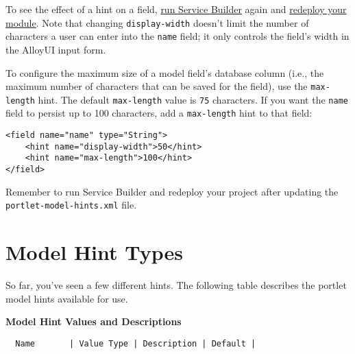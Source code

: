 To see the effect of a hint on a field,
\href{/docs/7-2/appdev/-/knowledge_base/a/running-service-builder}{run
Service Builder} again and
\href{/docs/7-2/reference/-/knowledge_base/r/deploying-a-project}{redeploy
your module}. Note that changing \texttt{display-width} doesn't limit
the number of characters a user can enter into the \texttt{name} field;
it only controls the field's width in the AlloyUI input form.

To configure the maximum size of a model field's database column (i.e.,
the maximum number of characters that can be saved for the field), use
the \texttt{max-length} hint. The default \texttt{max-length} value is
\texttt{75} characters. If you want the \texttt{name} field to persist
up to 100 characters, add a \texttt{max-length} hint to that field:

\begin{verbatim}
<field name="name" type="String">
    <hint name="display-width">50</hint>
    <hint name="max-length">100</hint>
</field>
\end{verbatim}

Remember to run Service Builder and redeploy your project after updating
the \texttt{portlet-model-hints.xml} file.

\section{Model Hint Types}\label{model-hint-types}

So far, you've seen a few different hints. The following table describes
the portlet model hints available for use.

\textbf{Model Hint Values and Descriptions}

\noindent\hrulefill

\begin{verbatim}
  Name       | Value Type | Description | Default |
\end{verbatim}

